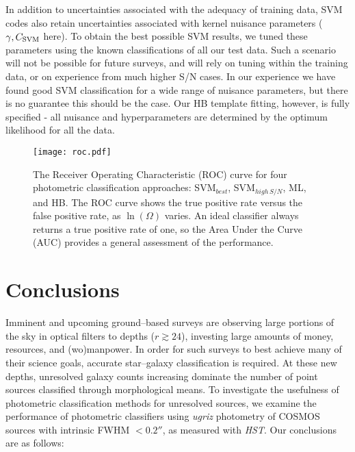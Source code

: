 \documentclass[12pt,preprint]{aastex}
\begin{document}
In addition to uncertainties associated with the adequacy of training data, SVM codes also 
retain uncertainties associated with kernel nuisance parameters ($\gamma,C_{\rm SVM}$ 
here).  To obtain the best possible SVM results, we tuned these parameters using the known 
classifications of all our test data.  Such a scenario will not be possible for future surveys, and 
will rely on tuning within the training data, or on experience from much higher S/N cases.  In 
our experience we have found good SVM classification for a wide range of nuisance 
parameters, but there is no guarantee this should be the case.  Our HB template fitting, however, 
is fully specified - all nuisance and hyperparameters are determined by the optimum likelihood 
for all the data.




\begin{figure}
\centering
\texttt{[image: roc.pdf]}
\caption{The Receiver Operating Characteristic (ROC) curve for four photometric 
classification approaches: SVM$_{best}$, SVM$_{high\,S/N}$, ML, and HB.  The ROC curve 
shows the true positive rate versus the false positive rate, as $\ln(\Omega)$ varies.  An ideal classifier 
always returns a true positive rate of one, so the Area Under the Curve (AUC) provides a 
general assessment of the performance.}
\label{fig:roc}
\end{figure}



\section{Conclusions}

Imminent and upcoming ground--based surveys are observing large portions of the sky in 
optical filters to depths ($r\gtrsim24$), investing large amounts of money, resources,  
and (wo)manpower.  In order for such surveys to best achieve many of their science goals, 
accurate star--galaxy classification is required.  At these new depths, unresolved 
galaxy counts increasing dominate the number of point sources classified through 
morphological means.  To investigate the usefulness of photometric classification methods 
for unresolved sources, we examine the performance of photometric classifiers using 
{\it ugriz} photometry of COSMOS sources with intrinsic FWHM $<0.2''$, as measured with 
{\it HST}.  Our conclusions are as follows:
\end{document}
